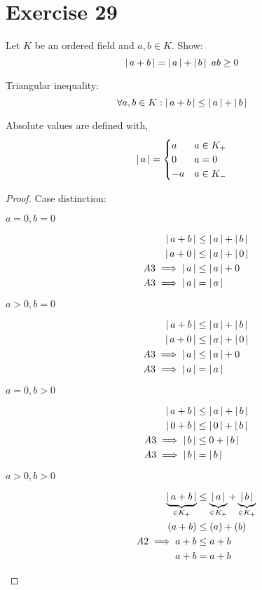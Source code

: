 \documentclass[a4paper]{article}
\theoremstyle{definition}
\newcommand\abs[1]{\left|\thinspace #1\thinspace\right|}
\begin{document}
\section{Exercise 29}
\begin{ex}
  Let $K$ be an ordered field and $a,b \in K$. Show:
  \[ \abs{a + b} = \abs{a} + \abs{b} \ ab \geq 0 \]
\end{ex}

Triangular inequality:
\[ \forall a, b \in K: \abs{a + b} \leq \abs{a} + \abs{b} \]

Absolute values are defined with,
\[
  \abs{a} = \begin{cases}
     a & a \in K_+ \\
     0 & a = 0 \\
    -a & a \in K_-
  \end{cases}
\]

\begin{proof}
  Case distinction:
  \begin{description}
    \item[$a = 0, b = 0$]
      \begin{align*}
        \abs{a + b} &\leq \abs{a} + \abs{b} \\
        \abs{a + 0} &\leq \abs{a} + \abs{0} \\
        A3 \implies \abs{a} &\leq \abs{a} + 0 \\
        A3 \implies \abs{a} &= \abs{a} \\
      \end{align*}
    \item[$a > 0, b = 0$]
      \begin{align*}
        \abs{a + b} &\leq \abs{a} + \abs{b} \\
        \abs{a + 0} &\leq \abs{a} + \abs{0} \\
        A3 \implies \abs{a} &\leq \abs{a} + 0 \\
        A3 \implies \abs{a} &= \abs{a} \\
      \end{align*}
    \item[$a = 0, b > 0$]
      \begin{align*}
        \abs{a + b} &\leq \abs{a} + \abs{b} \\
        \abs{0 + b} &\leq \abs{0} + \abs{b} \\
        A3 \implies \abs{b} &\leq 0 + \abs{b} \\
        A3 \implies \abs{b} &= \abs{b} \\
      \end{align*}
    \item[$a > 0, b > 0$]
      \begin{align*}
        \underbrace{\abs{a + b}}_{\in K_+} &\leq \underbrace{\abs{a}}_{\in K_+} + \underbrace{\abs{b}}_{\in K_+} \\
        (a + b) &\leq (a) + (b) \\
        A2 \implies a + b &\leq a + b \\
        a + b &= a + b \\
      \end{align*}
  \end{description}
\end{proof}
\end{document}
